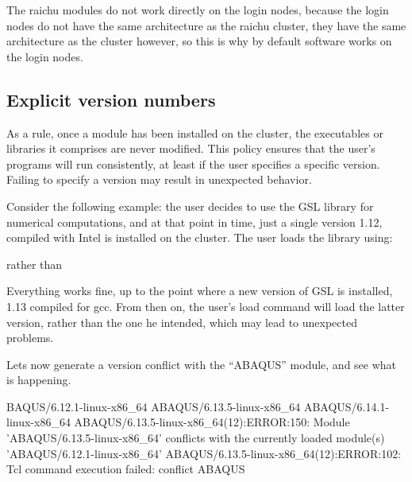 The raichu modules do not work directly on the login nodes, because the
login nodes do not have the same architecture as the raichu cluster, they
have the same architecture as the \hpcname cluster however, so this is why
by default software works on the login nodes.

\begin{prompt}
\end{prompt}

\fi

\subsection{Explicit version numbers}

As a rule, once a module has been installed on the cluster, the executables or
libraries it comprises are never modified. This policy ensures that the user's
programs will run consistently, at least if the user specifies a specific
version. Failing to specify a version may result in unexpected behavior.

Consider the following example: the user decides to use the GSL library for
numerical computations, and at that point in time, just a single version 1.12,
compiled with Intel is installed on the cluster. The user loads the library
using:

\begin{prompt}
\end{prompt}
rather than
\begin{prompt}
\end{prompt}

Everything works fine, up to the point where a new version of GSL is installed,
1.13 compiled for gcc. From then on, the user's load command will load the
latter version, rather than the one he intended, which may lead to unexpected
problems.

Lets now generate a version conflict with the ``ABAQUS'' module, and see what
is happening.

\begin{prompt}
BAQUS/6.12.1-linux-x86_64
ABAQUS/6.13.5-linux-x86_64
ABAQUS/6.14.1-linux-x86_64
ABAQUS/6.13.5-linux-x86_64(12):ERROR:150: Module 'ABAQUS/6.13.5-linux-x86_64' conflicts with the currently loaded module(s) 'ABAQUS/6.12.1-linux-x86_64'
ABAQUS/6.13.5-linux-x86_64(12):ERROR:102: Tcl command execution failed: conflict ABAQUS
\end{prompt}

